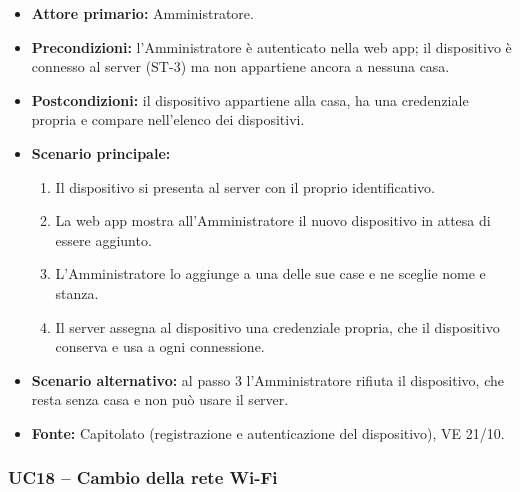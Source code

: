 \documentclass[12pt,a4paper]{article}
\newcommand{\tightlist}{\setlength{\itemsep}{1pt}\setlength{\parskip}{0pt}}
\begin{document}
\begin{itemize}

\tightlist

\item \textbf{Attore primario:} Amministratore.

\item \textbf{Precondizioni:} l'Amministratore è autenticato nella web app; il dispositivo è connesso al server (ST-3) ma non appartiene ancora a nessuna casa.

\item \textbf{Postcondizioni:} il dispositivo appartiene alla casa, ha una credenziale propria e compare nell'elenco dei dispositivi.

\item \textbf{Scenario principale:}

\begin{enumerate}

\tightlist

\item Il dispositivo si presenta al server con il proprio identificativo.

\item La web app mostra all'Amministratore il nuovo dispositivo in attesa di essere aggiunto.

\item L'Amministratore lo aggiunge a una delle sue case e ne sceglie nome e stanza.

\item Il server assegna al dispositivo una credenziale propria, che il dispositivo conserva e usa a ogni connessione.

\end{enumerate}

\item \textbf{Scenario alternativo:} al passo 3 l'Amministratore rifiuta il dispositivo, che resta senza casa e non può usare il server.

\item \textbf{Fonte:} Capitolato (registrazione e autenticazione del dispositivo), VE 21/10.

\end{itemize}



\subsubsection{UC18 -- Cambio della rete Wi-Fi}
\end{document}
